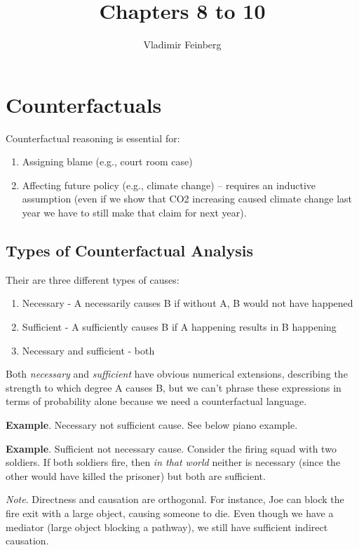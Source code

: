 \documentclass{article}
\title{Chapters 8 to 10}
\author{Vladimir Feinberg}
\begin{document}
\maketitle

\setcounter{section}{7}
\section{Counterfactuals}

Counterfactual reasoning is essential for:

\begin{enumerate}
\item Assigning blame (e.g., court room case)
\item Affecting future policy (e.g., climate change) -- requires an inductive assumption (even if we show that CO2 increasing caused climate change last year we have to still make that claim for next year).
\end{enumerate}

\subsection{Types of Counterfactual Analysis}

Their are three different types of causes:

\begin{enumerate}
\item Necessary - A necessarily causes B if without A, B would not have happened
\item Sufficient - A sufficiently causes B if A happening results in B happening
\item Necessary and sufficient - both
\end{enumerate}

Both \textit{necessary} and \textit{sufficient} have obvious numerical extensions, describing the strength to which degree A causes B, but we can't phrase these expressions in terms of probability alone because we need a counterfactual language.

\textbf{Example}. Necessary not sufficient cause. See below piano example.

\textbf{Example}. Sufficient not necessary cause. Consider the firing squad with two soldiers. If both soldiers fire, then \textit{in that world} neither is necessary (since the other would have killed the prisoner) but both are sufficient.

\textit{Note}. Directness and causation are orthogonal. For instance, Joe can block the fire exit with a large object, causing someone to die. Even though we have a mediator (large object blocking a pathway), we still have sufficient indirect causation.
\end{document}
